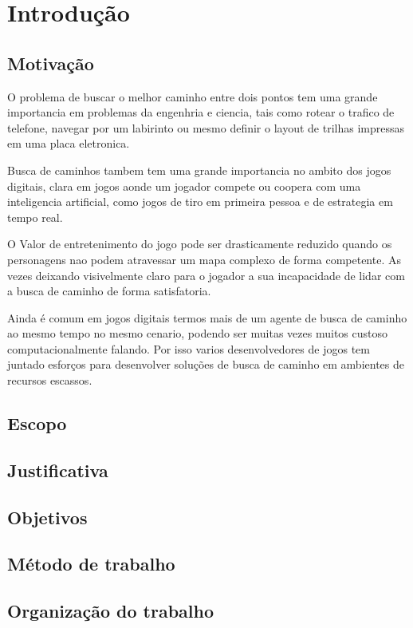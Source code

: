 
\chapter[Introdução]{Introdução}

\section{Motivação}

O problema de buscar o melhor caminho entre dois pontos tem uma grande importancia em problemas da engenhria e ciencia, tais como rotear o trafico de telefone, navegar por um labirinto ou mesmo definir o layout de trilhas impressas em uma placa eletronica.

Busca de caminhos tambem tem uma grande importancia no ambito dos jogos digitais, clara em jogos aonde um jogador compete ou coopera com uma inteligencia artificial, como jogos de tiro em primeira pessoa e de estrategia em tempo real.

O Valor de entretenimento do jogo pode ser drasticamente reduzido quando os personagens nao podem atravessar um mapa complexo de forma competente. As vezes deixando visivelmente claro para o jogador a sua incapacidade de lidar com a busca de caminho de forma satisfatoria.

Ainda é comum em jogos digitais termos mais de um agente de busca de caminho ao mesmo tempo no mesmo cenario, podendo ser muitas vezes muitos custoso computacionalmente falando. Por isso varios desenvolvedores de jogos tem juntado esforços para desenvolver soluções de busca de caminho em ambientes de recursos escassos. \cite{Pontevia}

   


	


\section{Escopo}



\section{Justificativa}


\section{Objetivos}


\section{Método de trabalho}


\section{Organização do trabalho}


